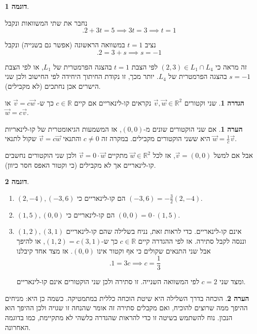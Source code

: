 \documentclass[12pt]{report}
\theoremstyle{plain}
\theoremstyle{definition}
\newtheorem{definition}[theorem]{הגדרה}
\newtheorem{example}{דוגמה}[chapter]
\newtheorem{remark}{הערה}[chapter]
\newcommand{\R}{\mathbb{R}}
\newcommand{\0}{\mathbf{0}}
\begin{document}
\begin{example}
\begin{enumerate}[label=\alph*.]
נחבר את שתי המשוואות ונקבל
$$	
	.2+3t=5\implies3t=3\implies t=1	
$$

נציב $t=1$ במשוואה הראשונה (אפשר גם בשנייה) ונקבל
$$
	.2=3+s\implies s=-1	
$$

זה מראה כי $(2,3)\in L_1\cap L_4$ לפי הצבת $t=1$ בהצגה
הפרמטרית של $L_1$, או לפי הצבת $s=-1$ בהצגה הפרמטרית של
$L_4$. יותר מכך, זו נקודת החיתוך היחידה לפי החישוב ולכן שני
הישרים אכן נחתכים (לא מקבילים). 
\end{enumerate}
\end{example}

\begin{definition}
שני וקטורים
$\vec{v},\vec{w}\in\R^2$
נקראים
קו-לינאריים אם קיים
$c\in\R$
כך ש-
$\vec{v}=c\vec{w}$
או
$\vec{w}=c\vec{v}$.
\end{definition}

\begin{remark}
אם שני הוקטורים שונים מ-$(0,0)$, אז המשמעות הגיאומטרית
של קו-לינאריות היא ששני הוקטורים מקבילים. במקרה זה $c\neq0$ והתנאי
$\vec{v}=c\vec{w}$ שקול לתנאי $\vec{w}=\frac{1}{c}\vec{v}$.

אבל אם למשל $\vec{v}=(0,0)$, אז לכל $\vec{w}\in\R^2$
מתקיים $\vec{v}=0\cdot\vec{w}$ ולכן שני הוקטורים נחשבים קו-לינאריים
אך לא מקבילים (כי וקטור האפס חסר כיוון).
\end{remark}

\begin{example}\
\begin{enumerate}[label=\alph*.]
\item $(2,-4),(-3,6)$ הם קו-לינאריים כי $(-3,6)=-\frac{3}{2}(2,-4)$.

\item $(1,5),(0,0)$ הם קו-לינאריים כי $(0,0)=0\cdot(1,5)$.

\item $(1,2),(3,1)$ אינם קו-לינאריים. כדי לראות זאת, נניח בשלילה
שהם קו-לינאריים וננסה לקבל סתירה. אז לפי ההגדרה קיים $c\in\R$
כך ש-$(1,2)=c(3,1)$, או להיפך אבל שני התנאים שקולים כי אף וקטור
אינו $(0,0)$. אז מצד אחד קיבלנו 
$$	
	.1=3c\implies c=\frac{1}{3}	
$$

ומצד שני $c=2$ לפי המשוואה השנייה. זו סתירה ולכן שני הוקטורים
אינם קו-לינאריים.
\end{enumerate}
\end{example}

\begin{remark}
הוכחה בדרך השלילה היא שיטת הוכחה כללית במתמטיקה. כשמה כן היא: מניחים
ההיפך ממה שרוצים להוכיח, ואם מקבלים סתירה זה אומר שהנחה זו שגויה ולכן
ההיפך הוא הנכון. נוח להשתמש בשיטה זו כדי להראות שהגדרה כלשהי לא מתקיימת,
כמו בדוגמה האחרונה.
\end{remark}
\end{document}
